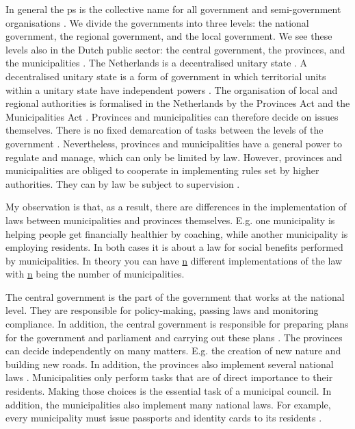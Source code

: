 In general the \gls{ps} is the collective name for all government and semi-government organisations \parencite{PrivacySense2016}. We divide the governments into three levels: the national government, the regional government, and the local government. We see these levels also in the Dutch public sector: the central government, the provinces, and the municipalities \parencite{Overheidsvormen}. The Netherlands is a decentralised unitary state \parencite[p.~10]{Libert2016}. A decentralised unitary state is a form of government in which territorial units within a unitary state have independent powers \parencite{Grondwetb}. The organisation of local and regional authorities is formalised in the Netherlands by the Provinces Act and the Municipalities Act \parencite{Grondwet}. Provinces and municipalities can therefore decide on issues themselves. There is no fixed demarcation of tasks between the levels of the government \parencite{Grondwet}. Nevertheless, provinces and municipalities have a general power to regulate and manage, which can only be limited by law. However, provinces and municipalities are obliged to cooperate in implementing rules set by higher authorities. They can by law be subject to supervision \parencite{Grondwetb}.

My observation is that, as a result, there are differences in the implementation of laws between municipalities and provinces themselves. E.g. one municipality is helping people get financially healthier by coaching, while another municipality is employing residents. In both cases it is about a law for social benefits performed by municipalities. In theory you can have \underline{n} different implementations of the law with \underline{n} being the number of municipalities.

The central government is the part of the government that works at the national level. They are responsible for policy-making, passing laws and monitoring compliance. In addition, the central government is responsible for preparing plans for the government and parliament and carrying out these plans \parencite{Takenrijksoverheid}.  The provinces can decide independently on many matters. E.g. the creation of new nature and building new roads. In addition, the provinces also implement several national laws \parencite{Takenprovincie}. Municipalities only perform tasks that are of direct importance to their residents. Making those choices is the essential task of a municipal council. In addition, the municipalities also implement many national laws. For example, every municipality must issue passports and identity cards to its residents \parencite{Takengemeente}. 

